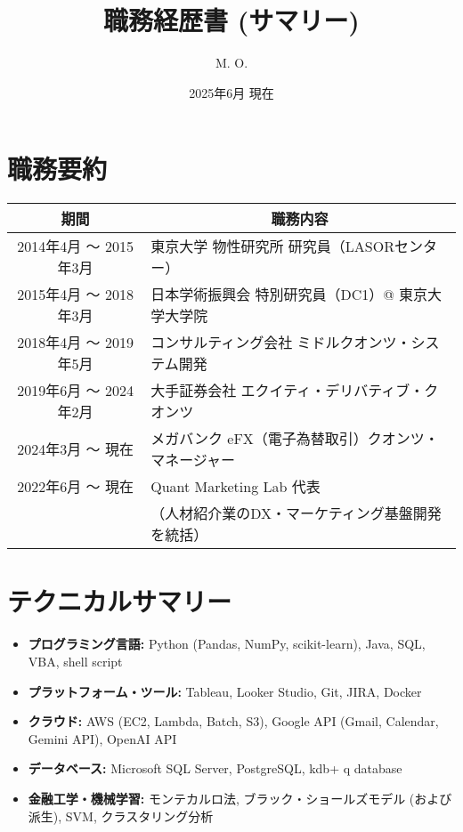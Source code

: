 \documentclass[uplatex,a4j,10.5pt,dvipdfmx]{jsarticle}
\title{\sffamily \bfseries 職務経歴書 (サマリー)}
\author{M. O.}
\date{2025年6月 現在}
\begin{document}
\maketitle

\section{職務要約}

\begin{longtable}{|c|p{14cm}|}
	\hline
	\multicolumn{1}{|c|}{\textbf{期間}} & \multicolumn{1}{c|}{\textbf{職務内容}} \\
	\hline
	\endhead

	\hline
	2014年4月 ～ 2015年3月                 & 東京大学 物性研究所 研究員（LASORセンター）          \\
	\hline
	2015年4月 ～ 2018年3月                 & 日本学術振興会 特別研究員（DC1）@ 東京大学大学院            \\
	\hline
	2018年4月 ～ 2019年5月                 & コンサルティング会社 ミドルクオンツ・システム開発          \\
	\hline
	2019年6月 ～ 2024年2月                 & 大手証券会社 エクイティ・デリバティブ・クオンツ           \\
	\hline
	2024年3月 ～ 現在                      & メガバンク eFX（電子為替取引）クオンツ・マネージャー       \\
    \hline
    2022年6月 ～ 現在 & Quant Marketing Lab 代表 \\
     & （人材紹介業のDX・マーケティング基盤開発を統括） \\
    \hline
\end{longtable}

\section{テクニカルサマリー}
\begin{itemize}
	\item \textbf{プログラミング言語:} Python (Pandas, NumPy, scikit-learn), Java, SQL, VBA, shell script
	\item \textbf{プラットフォーム・ツール:} Tableau, Looker Studio, Git, JIRA, Docker
	\item \textbf{クラウド:} AWS (EC2, Lambda, Batch, S3), Google API (Gmail, Calendar, Gemini API), OpenAI API
	\item \textbf{データベース:} Microsoft SQL Server, PostgreSQL, kdb+ q database
	\item \textbf{金融工学・機械学習:} モンテカルロ法, ブラック・ショールズモデル (および派生), SVM, クラスタリング分析
\end{itemize}
\end{document}
